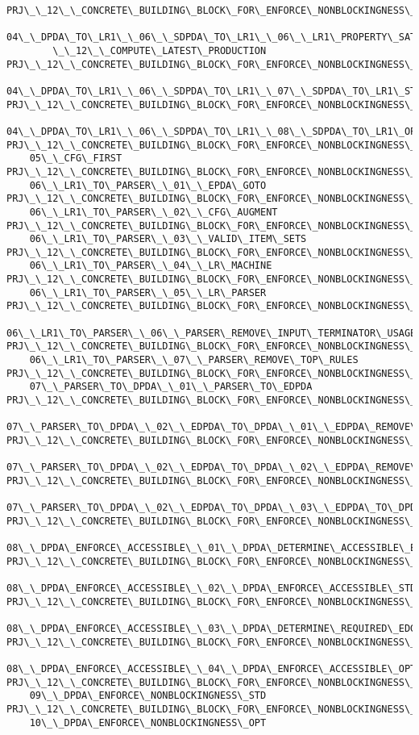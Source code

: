 \begin{verbatim}
PRJ\_\_12\_\_CONCRETE\_BUILDING\_BLOCK\_FOR\_ENFORCE\_NONBLOCKINGNESS\_\_
    04\_\_DPDA\_TO\_LR1\_\_06\_\_SDPDA\_TO\_LR1\_\_06\_\_LR1\_PROPERTY\_SATSIFACTION
        \_\_12\_\_COMPUTE\_LATEST\_PRODUCTION
PRJ\_\_12\_\_CONCRETE\_BUILDING\_BLOCK\_FOR\_ENFORCE\_NONBLOCKINGNESS\_\_
    04\_\_DPDA\_TO\_LR1\_\_06\_\_SDPDA\_TO\_LR1\_\_07\_\_SDPDA\_TO\_LR1\_STD
PRJ\_\_12\_\_CONCRETE\_BUILDING\_BLOCK\_FOR\_ENFORCE\_NONBLOCKINGNESS\_\_
    04\_\_DPDA\_TO\_LR1\_\_06\_\_SDPDA\_TO\_LR1\_\_08\_\_SDPDA\_TO\_LR1\_OPT
PRJ\_\_12\_\_CONCRETE\_BUILDING\_BLOCK\_FOR\_ENFORCE\_NONBLOCKINGNESS\_\_
    05\_\_CFG\_FIRST
PRJ\_\_12\_\_CONCRETE\_BUILDING\_BLOCK\_FOR\_ENFORCE\_NONBLOCKINGNESS\_\_
    06\_\_LR1\_TO\_PARSER\_\_01\_\_EPDA\_GOTO
PRJ\_\_12\_\_CONCRETE\_BUILDING\_BLOCK\_FOR\_ENFORCE\_NONBLOCKINGNESS\_\_
    06\_\_LR1\_TO\_PARSER\_\_02\_\_CFG\_AUGMENT
PRJ\_\_12\_\_CONCRETE\_BUILDING\_BLOCK\_FOR\_ENFORCE\_NONBLOCKINGNESS\_\_
    06\_\_LR1\_TO\_PARSER\_\_03\_\_VALID\_ITEM\_SETS
PRJ\_\_12\_\_CONCRETE\_BUILDING\_BLOCK\_FOR\_ENFORCE\_NONBLOCKINGNESS\_\_
    06\_\_LR1\_TO\_PARSER\_\_04\_\_LR\_MACHINE
PRJ\_\_12\_\_CONCRETE\_BUILDING\_BLOCK\_FOR\_ENFORCE\_NONBLOCKINGNESS\_\_
    06\_\_LR1\_TO\_PARSER\_\_05\_\_LR\_PARSER
PRJ\_\_12\_\_CONCRETE\_BUILDING\_BLOCK\_FOR\_ENFORCE\_NONBLOCKINGNESS\_\_
    06\_\_LR1\_TO\_PARSER\_\_06\_\_PARSER\_REMOVE\_INPUT\_TERMINATOR\_USAGE
PRJ\_\_12\_\_CONCRETE\_BUILDING\_BLOCK\_FOR\_ENFORCE\_NONBLOCKINGNESS\_\_
    06\_\_LR1\_TO\_PARSER\_\_07\_\_PARSER\_REMOVE\_TOP\_RULES
PRJ\_\_12\_\_CONCRETE\_BUILDING\_BLOCK\_FOR\_ENFORCE\_NONBLOCKINGNESS\_\_
    07\_\_PARSER\_TO\_DPDA\_\_01\_\_PARSER\_TO\_EDPDA
PRJ\_\_12\_\_CONCRETE\_BUILDING\_BLOCK\_FOR\_ENFORCE\_NONBLOCKINGNESS\_\_
    07\_\_PARSER\_TO\_DPDA\_\_02\_\_EDPDA\_TO\_DPDA\_\_01\_\_EDPDA\_REMOVE\_NIL\_POPPING\_EDGES
PRJ\_\_12\_\_CONCRETE\_BUILDING\_BLOCK\_FOR\_ENFORCE\_NONBLOCKINGNESS\_\_
    07\_\_PARSER\_TO\_DPDA\_\_02\_\_EDPDA\_TO\_DPDA\_\_02\_\_EDPDA\_REMOVE\_MASS\_POPPING\_EDGES
PRJ\_\_12\_\_CONCRETE\_BUILDING\_BLOCK\_FOR\_ENFORCE\_NONBLOCKINGNESS\_\_
    07\_\_PARSER\_TO\_DPDA\_\_02\_\_EDPDA\_TO\_DPDA\_\_03\_\_EDPDA\_TO\_DPDA
PRJ\_\_12\_\_CONCRETE\_BUILDING\_BLOCK\_FOR\_ENFORCE\_NONBLOCKINGNESS\_\_
    08\_\_DPDA\_ENFORCE\_ACCESSIBLE\_\_01\_\_DPDA\_DETERMINE\_ACCESSIBLE\_EDGES
PRJ\_\_12\_\_CONCRETE\_BUILDING\_BLOCK\_FOR\_ENFORCE\_NONBLOCKINGNESS\_\_
    08\_\_DPDA\_ENFORCE\_ACCESSIBLE\_\_02\_\_DPDA\_ENFORCE\_ACCESSIBLE\_STD
PRJ\_\_12\_\_CONCRETE\_BUILDING\_BLOCK\_FOR\_ENFORCE\_NONBLOCKINGNESS\_\_
    08\_\_DPDA\_ENFORCE\_ACCESSIBLE\_\_03\_\_DPDA\_DETERMINE\_REQUIRED\_EDGES
PRJ\_\_12\_\_CONCRETE\_BUILDING\_BLOCK\_FOR\_ENFORCE\_NONBLOCKINGNESS\_\_
    08\_\_DPDA\_ENFORCE\_ACCESSIBLE\_\_04\_\_DPDA\_ENFORCE\_ACCESSIBLE\_OPT
PRJ\_\_12\_\_CONCRETE\_BUILDING\_BLOCK\_FOR\_ENFORCE\_NONBLOCKINGNESS\_\_
    09\_\_DPDA\_ENFORCE\_NONBLOCKINGNESS\_STD
PRJ\_\_12\_\_CONCRETE\_BUILDING\_BLOCK\_FOR\_ENFORCE\_NONBLOCKINGNESS\_\_
    10\_\_DPDA\_ENFORCE\_NONBLOCKINGNESS\_OPT


\end{verbatim}
